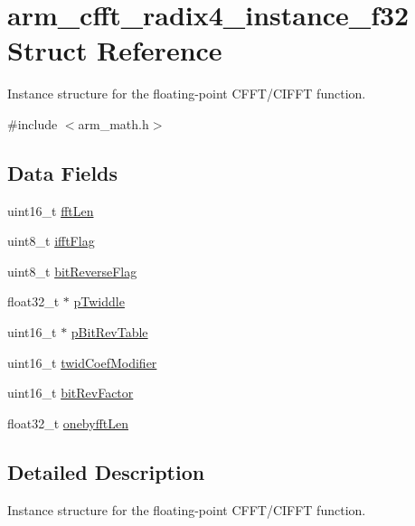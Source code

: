 \hypertarget{structarm__cfft__radix4__instance__f32}{}\section{arm\+\_\+cfft\+\_\+radix4\+\_\+instance\+\_\+f32 Struct Reference}
\label{structarm__cfft__radix4__instance__f32}


Instance structure for the floating-\/point C\+F\+F\+T/\+C\+I\+F\+FT function.  




{\ttfamily \#include $<$arm\+\_\+math.\+h$>$}

\subsection*{Data Fields}
\begin{DoxyCompactItemize}
\item 
uint16\+\_\+t \mbox{\hyperlink{structarm__cfft__radix4__instance__f32_ab8db3bbe7c61e6bb8ca2a55e3446e11a}{fft\+Len}}
\item 
uint8\+\_\+t \mbox{\hyperlink{structarm__cfft__radix4__instance__f32_ad6ca6e223f986ebfd94c5ee1e410aa73}{ifft\+Flag}}
\item 
uint8\+\_\+t \mbox{\hyperlink{structarm__cfft__radix4__instance__f32_a09a221a818c6d0e064557a99e2fe9a8b}{bit\+Reverse\+Flag}}
\item 
float32\+\_\+t $\ast$ \mbox{\hyperlink{structarm__cfft__radix4__instance__f32_aca581481fccdff0f557f54a3ef20d967}{p\+Twiddle}}
\item 
uint16\+\_\+t $\ast$ \mbox{\hyperlink{structarm__cfft__radix4__instance__f32_a46a2fb328199897af100fea0bfdf59aa}{p\+Bit\+Rev\+Table}}
\item 
uint16\+\_\+t \mbox{\hyperlink{structarm__cfft__radix4__instance__f32_afe772e5b5001c9d8e85032115a8df5bf}{twid\+Coef\+Modifier}}
\item 
uint16\+\_\+t \mbox{\hyperlink{structarm__cfft__radix4__instance__f32_a33386d95319dc3ee7097b3a8e52e01ec}{bit\+Rev\+Factor}}
\item 
float32\+\_\+t \mbox{\hyperlink{structarm__cfft__radix4__instance__f32_acf295a7b97b7d48a9cae4d1ab5ed00f6}{onebyfft\+Len}}
\end{DoxyCompactItemize}


\subsection{Detailed Description}
Instance structure for the floating-\/point C\+F\+F\+T/\+C\+I\+F\+FT function. 

